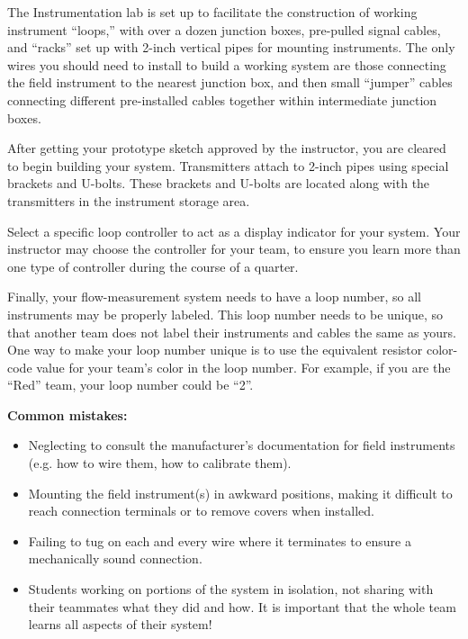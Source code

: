 The Instrumentation lab is set up to facilitate the construction of working instrument ``loops,'' with over a dozen junction boxes, pre-pulled signal cables, and ``racks'' set up with 2-inch vertical pipes for mounting instruments.  The only wires you should need to install to build a working system are those connecting the field instrument to the nearest junction box, and then small ``jumper'' cables connecting different pre-installed cables together within intermediate junction boxes.

After getting your prototype sketch approved by the instructor, you are cleared to begin building your system.  Transmitters attach to 2-inch pipes using special brackets and U-bolts.  These brackets and U-bolts are located along with the transmitters in the instrument storage area.  

Select a specific loop controller to act as a display indicator for your system.  Your instructor may choose the controller for your team, to ensure you learn more than one type of controller during the course of a quarter.

Finally, your flow-measurement system needs to have a loop number, so all instruments may be properly labeled.  This loop number needs to be unique, so that another team does not label their instruments and cables the same as yours.  One way to make your loop number unique is to use the equivalent resistor color-code value for your team's color in the loop number.  For example, if you are the ``Red'' team, your loop number could be ``2''. 

\vskip 10pt

{\bf Common mistakes:}

\begin{itemize}
\item{} Neglecting to consult the manufacturer's documentation for field instruments (e.g. how to wire them, how to calibrate them).
\item{} Mounting the field instrument(s) in awkward positions, making it difficult to reach connection terminals or to remove covers when installed.
\item{} Failing to tug on each and every wire where it terminates to ensure a mechanically sound connection.
\item{} Students working on portions of the system in isolation, not sharing with their teammates what they did and how.  It is important that the whole team learns all aspects of their system!
\end{itemize}

